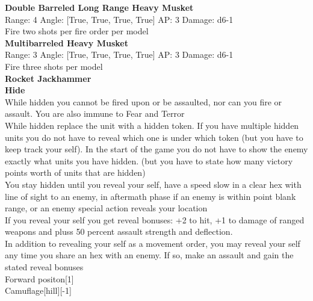 {\bf Double Barreled Long Range Heavy Musket } \\



Range: 4  Angle: [True, True, True, True] AP: 3 Damage: d6-1 \\
Fire two shots per fire order per model\\ 




{\bf Multibarreled Heavy Musket } \\



Range: 3  Angle: [True, True, True, True] AP: 3 Damage: d6-1 \\
Fire three shots per model\\ 




{\bf Rocket Jackhammer } \\






{\bf Hide } \\

While hidden you cannot be fired upon or be assaulted, nor can you fire or assault. You are also immune to Fear and Terror\\ 
While hidden replace the unit with a hidden token. If you have multiple hidden units you do not have to reveal which one is under which token (but you have to keep track your self). In the start of the game you do not have to show the enemy exactly what units you have hidden. (but you have to state how many victory points worth of units that are hidden)\\ 
You stay hidden until you reveal your self, have a speed slow in a clear hex with line of sight to an enemy, in aftermath phase if an enemy is within point blank range, or an enemy special action reveals your location\\ 
If you reveal your self you get reveal bonuses: +2 to hit, +1 to damage of ranged weapons and pluss 50 percent assault strength and deflection.\\ 
In addition to revealing your self as a movement order, you may reveal your self any time you share an hex with an enemy. If so, make an assault and gain the stated reveal bonuses\\ 
Forward positon[1]\\ 
Camuflage[hill][-1]\\ 





